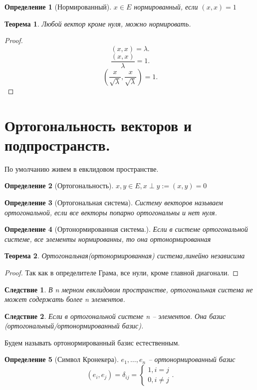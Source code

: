 \documentclass{scrartcl}
\newtheorem{theorem}{Теорема}
\newtheorem{definition}{Определение}
\newtheorem{corollary}{Следствие}[theorem]
\begin{document}
\begin{definition}[Нормированный]
	$x \in E$ нормированный, если  $(x,x) = 1$
\end{definition}
\begin{theorem}
	Любой вектор кроме нуля, можно нормировать.
\end{theorem}
\begin{proof}
	\[
		(x,x) = \lambda
		.\]
	\[
		\frac{(x,x)}{\lambda} = 1
		.\]
	\[
		(\frac{x}{\sqrt{\lambda} },\frac{x}{\sqrt{\lambda}}) = 1
		.\]
\end{proof}
\section{Ортогональность векторов и подпространств.}
По умолчанию живем в евклидовом пространстве.
\begin{definition}[Ортогональность]
	$x,y \in E, x \perp y := (x,y) = 0$
\end{definition}
\begin{definition}[Ортогональная система]
	Систему векторов называем ортогональной, если все векторы попарно ортогональны и нет нуля.
\end{definition}
\begin{definition}[Ортонормированная система.]
	Если в системе ортогональной системе, все элементы нормированны, то она ортонормированная
\end{definition}
\begin{theorem}
	Ортогональная(ортонормированная) система,линейно независима
\end{theorem}
\begin{proof}
	Так как в определителе Грама, все нули, кроме главной диагонали.
\end{proof}
\begin{corollary}
	В n мерном евклидовом пространстве, ортогональная система не может содержать более n элементов.
\end{corollary}
\begin{corollary}
	Если в ортогональной системе n -- элементов. Она базис (ортогональный/ортонормированный базис).
\end{corollary}
Будем называть ортонормированный базис естественным.
\begin{definition}[Символ Кронекера]
	$e_1,\dots,e_{n}$ -- ортонормированный базис
	\[
		(e_{i},e_{j}) = \delta_{ij} =
		\begin{cases}
			1, i = j \\
			0, i \neq j
		\end{cases}
		.\]
\end{definition}
\end{document}

